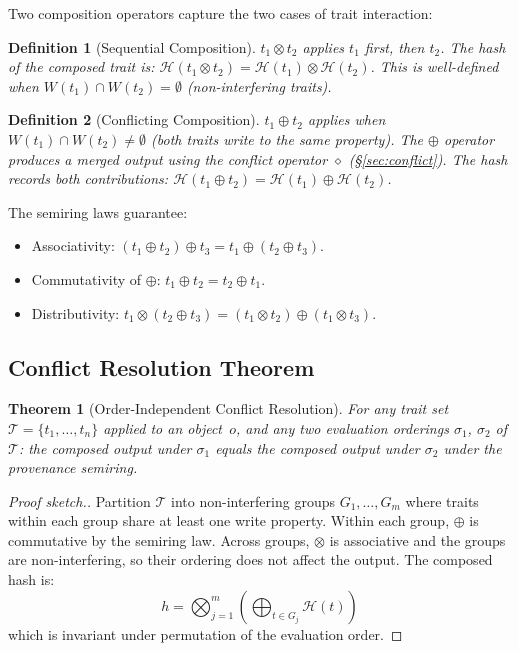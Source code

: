 \documentclass[sigconf,nonacm]{acmart}
\newcommand{\hashfn}{\mathcal{H}}
\newcommand{\tropplus}{\oplus}
\newcommand{\tropmult}{\otimes}
\newcommand{\traitset}{\mathcal{T}}
\newcommand{\conflictop}{\diamond}
\newtheorem{definition}{Definition}
\newtheorem{theorem}{Theorem}
\begin{document}
Two composition operators capture the two cases of trait
interaction:

\begin{definition}[Sequential Composition]
$t_1 \tropmult t_2$ applies $t_1$ first, then $t_2$.
The hash of the composed trait is:
$\hashfn(t_1 \tropmult t_2) = \hashfn(t_1) \tropmult
\hashfn(t_2)$.
This is well-defined when $W(t_1) \cap W(t_2) = \emptyset$
(non-interfering traits).
\end{definition}

\begin{definition}[Conflicting Composition]
$t_1 \tropplus t_2$ applies when $W(t_1) \cap W(t_2) \neq
\emptyset$ (both traits write to the same property). The
$\tropplus$ operator produces a \emph{merged} output
using the conflict operator $\conflictop$ (\S\ref{sec:conflict}).
The hash records both contributions:
$\hashfn(t_1 \tropplus t_2) = \hashfn(t_1) \tropplus
\hashfn(t_2)$.
\end{definition}

The semiring laws guarantee:
\begin{itemize}
  \item Associativity: $(t_1 \tropplus t_2) \tropplus t_3
    = t_1 \tropplus (t_2 \tropplus t_3)$.
  \item Commutativity of $\tropplus$:
    $t_1 \tropplus t_2 = t_2 \tropplus t_1$.
  \item Distributivity: $t_1 \tropmult (t_2 \tropplus t_3)
    = (t_1 \tropmult t_2) \tropplus (t_1 \tropmult t_3)$.
\end{itemize}

\subsection{Conflict Resolution Theorem}
\begin{theorem}[Order-Independent Conflict Resolution]
\label{thm:order-independence}
For any trait set $\traitset = \{t_1, \ldots, t_n\}$
applied to an object~$o$, and any two evaluation orderings
$\sigma_1$, $\sigma_2$ of $\traitset$: the composed output
under $\sigma_1$ equals the composed output under $\sigma_2$
under the provenance semiring.
\end{theorem}

\begin{proof}[Proof sketch.]
Partition $\traitset$ into non-interfering groups
$G_1, \ldots, G_m$ where traits within each group share
at least one write property. Within each group, $\tropplus$
is commutative by the semiring law. Across groups,
$\tropmult$ is associative and the groups are non-interfering,
so their ordering does not affect the output. The composed
hash is:
$$h = \bigotimes_{j=1}^{m} \left(
  \bigoplus_{t \in G_j} \hashfn(t) \right)$$
which is invariant under permutation of the evaluation order.
\end{proof}
\end{document}
